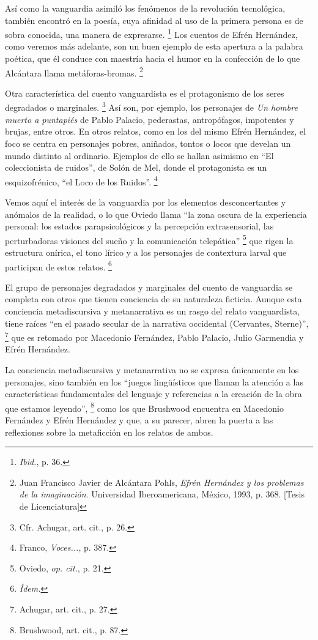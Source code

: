 \documentclass[14pt,twoside,final]{extbook} %
\let\oldfootnote\footnote
\renewcommand\footnote[1]{%
\oldfootnote{\hspace{1mm}#1}}
\begin{document}
Así como la vanguardia asimiló los fenómenos de la revolución tecnológica, también encontró en la poesía, cuya afinidad al uso de la primera persona es de sobra conocida, una manera de expresarse.\footnote{\emph{Ibid.}, p. 36.} Los cuentos de Efrén Hernández, como veremos más adelante, son un buen ejemplo de esta apertura a la palabra poética, que él conduce con maestría hacia el humor en la confección de lo que Alcántara llama metáforas-bromas.\footnote{Juan Francisco Javier de Alcántara Pohls, \emph{Efrén Hernández y los problemas de la imaginación}. Universidad Iberoamericana, México, 1993, p. 368. [Tesis de Licenciatura]}

Otra característica del cuento vanguardista es el protagonismo de los seres degradados o marginales.\footnote{Cfr. Achugar, art. cit., p. 26.} Así son, por ejemplo, los personajes de \emph{Un hombre muerto a puntapiés} de Pablo Palacio, pederastas, antropófagos, impotentes y brujas, entre otros. En otros relatos, como en los del mismo Efrén Hernández, el foco se centra en personajes pobres, aniñados, tontos o locos que develan un mundo distinto al ordinario. Ejemplos de ello se hallan asimismo en ``El coleccionista de ruidos'', de Solón de Mel, donde el protagonista es un esquizofrénico, ``el Loco de los Ruidos''.\footnote{Franco, \emph{Voces...}, p. 387.}

Vemos aquí el interés de la vanguardia por los elementos desconcertantes y anómalos de la realidad, o lo que Oviedo llama ``la zona oscura de la experiencia personal: los estados parapsicológicos y la percepción extrasensorial, las perturbadoras visiones del sueño y la comunicación telepática''\footnote{Oviedo, \emph{op. cit.}, p. 21.} que rigen la estructura onírica, el tono lírico y a los personajes de contextura larval que participan de estos relatos.\footnote{\em Ídem.}

El grupo de personajes degradados y marginales del cuento de vanguardia se completa con otros que tienen conciencia de su naturaleza ficticia. Aunque esta conciencia metadiscursiva y metanarrativa es un rasgo del relato vanguardista, tiene raíces ``en el pasado secular de la narrativa occidental (Cervantes, Sterne)'',\footnote{Achugar, art. cit., p. 27.} que es retomado por Macedonio Fernández, Pablo Palacio, Julio Garmendia y Efrén Hernández.

La conciencia metadiscursiva y metanarrativa no se expresa únicamente en los personajes, sino también en los ``juegos lingüísticos que llaman la atención a las características fundamentales del lenguaje
y referencias a la creación de la obra que estamos leyendo'',\footnote{Brushwood, art. cit., p. 87.} como los que Brushwood encuentra en Macedonio Fernández y Efrén Hernández y que, a su parecer, abren la puerta a las reflexiones sobre la metaficción en los relatos de ambos.
\end{document}
